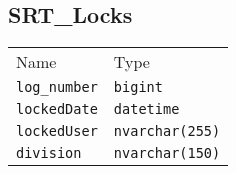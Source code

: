 \subsection{SRT\_Locks}
\begin{table}[h]
\centering
\begin{tabular}{ll}
Name    & Type  \\
\verb|log_number|   &   \verb|bigint|       \\
\verb|lockedDate|   &   \verb|datetime|     \\
\verb|lockedUser|   &   \verb|nvarchar(255)|\\
\verb|division|     &   \verb|nvarchar(150)|
\end{tabular}
\end{table}

